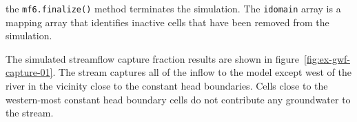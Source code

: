 \noindent the \texttt{mf6.finalize()} method terminates the \MF simulation. The \texttt{idomain} array is a mapping array that identifies inactive cells that have been removed from the simulation.

The simulated streamflow capture fraction results are shown in figure~\ref{fig:ex-gwf-capture-01}. The stream captures all of the inflow to the model except west of the river in the vicinity close to the constant head boundaries. Cells close to the western-most constant head boundary cells do not contribute any groundwater to the stream.


